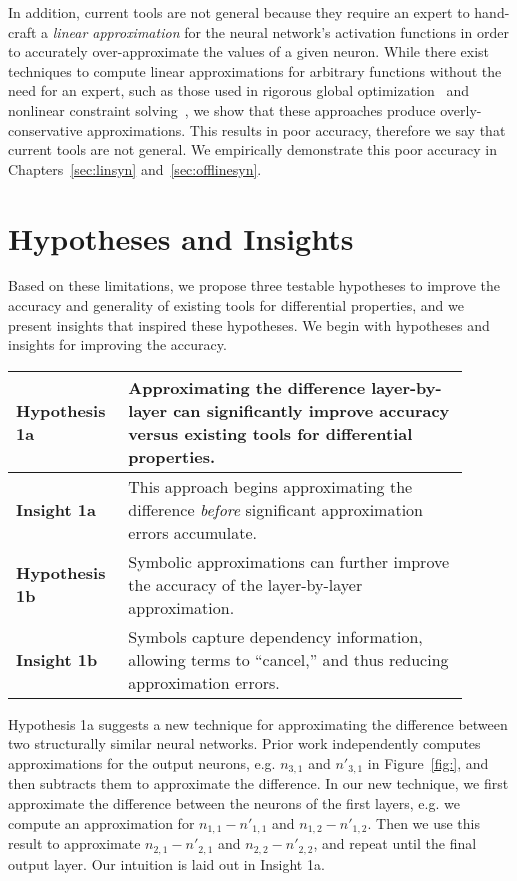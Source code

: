 In addition, current tools are not general because they require an expert to
hand-craft a \textit{linear approximation} for the neural network's activation
functions in order to accurately over-approximate the values of a given neuron.
While there exist techniques to compute linear approximations for arbitrary
functions without the need for an expert, such as those used in rigorous global
optimization~\cite{ibex} and nonlinear constraint solving~\cite{gao2013dreal}, we
show that these approaches produce overly-conservative approximations. This
results in poor accuracy, therefore we say that current tools are not general. We
empirically demonstrate this poor accuracy in Chapters~\ref{sec:linsyn}
and~\ref{sec:offlinesyn}.


\section{Hypotheses and Insights}
Based on these limitations, we propose three testable hypotheses to improve the
accuracy and generality of existing tools for differential properties, and we
present insights that inspired these hypotheses. We begin with hypotheses and
insights for improving the accuracy.

\begin{table}[h]
	\centering
	\large
	\begin{tabular}{|p{0.2\linewidth}|p{0.7\linewidth}|} \hline
		\textbf{Hypothesis 1a}      &
		Approximating the difference layer-by-layer can significantly improve
		accuracy versus existing tools for differential properties. \\ \hline
		\textbf{Insight 1a}        &
		This approach begins approximating the difference \textit{before}
		significant approximation errors accumulate. \\ \hline
		\textbf{Hypothesis 1b}        &
		Symbolic approximations can further improve the accuracy of the
		layer-by-layer approximation. \\ \hline
		\textbf{Insight 1b}        &
		Symbols capture dependency information, allowing terms to
		``cancel,'' and thus reducing approximation errors. \\ \hline
	\end{tabular}
\end{table}

Hypothesis 1a suggests a new technique for approximating the difference between
two structurally similar neural networks. Prior work independently computes
approximations for the output neurons, e.g. $ n_{3,1} $ and $ n'_{3,1} $ in
Figure~\ref{fig:}, and then subtracts them to approximate the difference. In our
new technique, we first approximate the difference between the neurons of the
first layers, e.g. we compute an approximation for $ n_{1,1} - n'_{1,1} $ and $
n_{1,2} - n'_{1,2} $. Then we use this result to approximate $ n_{2,1} - n'_{2,1}
$ and $ n_{2,2} - n'_{2,2} $, and repeat until the final output layer. Our
intuition is laid out in Insight 1a.


